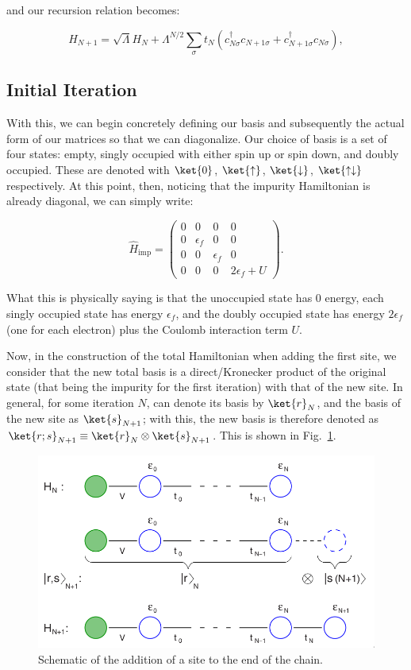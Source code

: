 and our recursion relation becomes:

\begin{equation}
  H_{N+1} = \sqrt{\Lambda}H_N  + \Lambda^{N/2}\sum_\sigma t_N\left( c^\dagger_{N\sigma}c_{N+1\sigma} + c^\dagger_{N+1\sigma}c_{N\sigma} \right),
\end{equation}


\subsection{Initial Iteration}

With this, we can begin concretely defining our basis and subsequently the actual form of our matrices so that we can diagonalize. Our choice of basis is a set of four states: empty, singly occupied with either spin up or spin down, and doubly occupied. These are denoted with $\ket{0}$, $\ket{\uparrow}$, $\ket{\downarrow}$, $\ket{\uparrow\downarrow}$ respectively. At this point, then, noticing that the impurity Hamiltonian is already diagonal, we can simply write:

\begin{equation}
  \hat{H}_{\mathrm{imp}} = \begin{pmatrix}0 & 0 & 0 & 0 \\ 0 & \epsilon_f & 0 & 0 \\ 0 & 0 & \epsilon_f & 0 \\ 0 & 0 & 0 & 2\epsilon_f + U\end{pmatrix}.\label{eq:4-nrg-himp}
\end{equation}

What this is physically saying is that the unoccupied state has 0 energy, each singly occupied state has energy $\epsilon_f$, and the doubly occupied state has energy $2\epsilon_f$ (one for each electron) plus the Coulomb interaction term $U$.

Now, in the construction of the total Hamiltonian when adding the first site, we consider that the new total basis is a direct/Kronecker product of the original state (that being the impurity for the first iteration) with that of the new site. In general, for some iteration $N$, can denote its basis by $\ket{r}_N$, and the basis of the new site as $\ket{s}_{N+1}$; with this, the new basis is therefore denoted as $\ket{r;s}_{N+1} \equiv \ket{r}_N \otimes \ket{s}_{N+1}$. This is shown in Fig.~\ref{fig:4-nrg-directprod}.

\begin{figure}
  \centering
  \includegraphics[width=0.6\linewidth]{./gfx/outer-product.png}
  \caption{Schematic of the addition of a site to the end of the chain.}
  \label{fig:4-nrg-directprod}
\end{figure}

